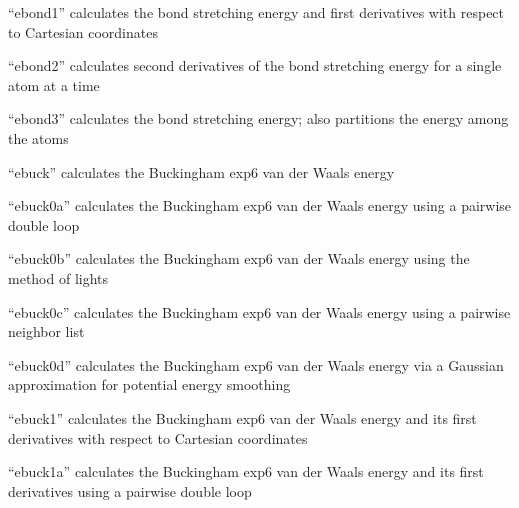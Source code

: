 \documentclass[letterpaper,11pt,english]{sphinxmanual}
\begin{document}
\sphinxAtStartPar
{}

\sphinxAtStartPar
“ebond1” calculates the bond stretching energy and first derivatives with respect to Cartesian coordinates

\sphinxAtStartPar
{}

\sphinxAtStartPar
“ebond2” calculates second derivatives of the bond stretching energy for a single atom at a time

\sphinxAtStartPar
{}

\sphinxAtStartPar
“ebond3” calculates the bond stretching energy; also partitions the energy among the atoms

\sphinxAtStartPar
{}

\sphinxAtStartPar
“ebuck” calculates the Buckingham exp\sphinxhyphen{}6 van der Waals energy

\sphinxAtStartPar
{}

\sphinxAtStartPar
“ebuck0a” calculates the Buckingham exp\sphinxhyphen{}6 van der Waals energy using a pairwise double loop

\sphinxAtStartPar
{}

\sphinxAtStartPar
“ebuck0b” calculates the Buckingham exp\sphinxhyphen{}6 van der Waals energy using the method of lights

\sphinxAtStartPar
{}

\sphinxAtStartPar
“ebuck0c” calculates the Buckingham exp\sphinxhyphen{}6 van der Waals energy using a pairwise neighbor list

\sphinxAtStartPar
{}

\sphinxAtStartPar
“ebuck0d” calculates the Buckingham exp\sphinxhyphen{}6 van der Waals energy via a Gaussian approximation for potential energy smoothing

\sphinxAtStartPar
{}

\sphinxAtStartPar
“ebuck1” calculates the Buckingham exp\sphinxhyphen{}6 van der Waals energy and its first derivatives with respect to Cartesian coordinates

\sphinxAtStartPar
{}

\sphinxAtStartPar
“ebuck1a” calculates the Buckingham exp\sphinxhyphen{}6 van der Waals energy and its first derivatives using a pairwise double loop
\end{document}
